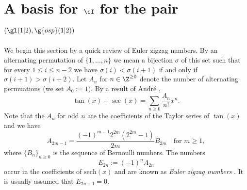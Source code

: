 \documentclass[11pt]{amsart}
\begin{document}
\section{A basis for $\cI$  for the pair $(\gl(1|2),\g{osp}(1|2))$}
We begin this section by a quick review of Euler zigzag numbers. By an alternating permutation of $\{1,\ldots,n\}$ we mean a bijection $\sigma$ of this set such that for every $1\leq i\leq n-2$ we have $\sigma(i)<\sigma(i+1)$ if and only if $\sigma(i+1)>\sigma(i+2)$. 
Let $A_n$ for $n\in\Z^{\geq 0} $ denote the number of alternating permuations (we set $A_0:=1)$.
By  a result of 
Andr\'{e} 
\cite{andre1881permutations},  
\[
\tan(x) + \sec(x) = \sum_{n \geqslant 0} \frac{A_n}{n!} x^n.
\]
Note that the $A_{n}$ for odd $n$ are the coefficients of the Taylor series of $\tan(x)$ and we have 
\[
A_{2m-1}=\frac{(-1)^{m-1}2^{2m}(2^{2m}-1)}{2m}B_{2m}\quad\text{for }m\geq 1,
\]
where  $\{B_n\}_{n\geq 0}$ is the sequence of Bernoulli numbers. The numbers \[
E_{2n}:=(-1)^nA_{2n}
\] occur in the coefficients of $\mathrm{sech}(x)$ and are known as  \emph{Euler zigzag numbers}  
 \cite{graham1994concrete,abramowitz1968handbook}. 
 It is usually assumed that $E_{2n+1}=0$.
\end{document}
